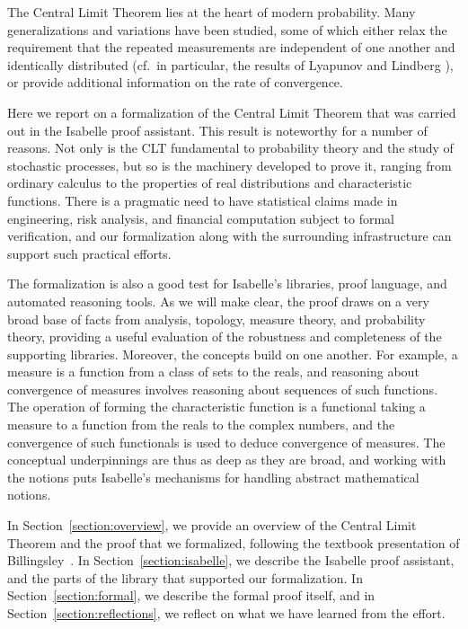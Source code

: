 \documentclass{svjour3}
\begin{document}
The Central Limit Theorem lies at the heart of modern probability. Many generalizations and variations have been studied, some of which either relax the requirement that the repeated measurements are independent of one another and identically distributed (cf.~in particular, the results of Lyapunov and Lindberg \cite{billingsley:95}), or provide additional information on the rate of convergence.

Here we report on a formalization of the Central Limit Theorem that was carried out in the Isabelle proof assistant. This result is noteworthy for a number of reasons. Not only is the CLT fundamental to probability theory and the study of stochastic processes, but so is the machinery developed to prove it, ranging from ordinary calculus to the properties of real distributions and characteristic functions. There is a pragmatic need to have statistical claims made in engineering, risk analysis, and financial computation subject to formal verification, and our formalization along with the surrounding infrastructure can support such practical efforts.

The formalization is also a good test for Isabelle's libraries, proof language, and automated reasoning tools. As we will make clear, the proof draws on a very broad base of facts from analysis, topology, measure theory, and probability theory, providing a useful evaluation of the robustness and completeness of the supporting libraries. Moreover, the concepts build on one another. For example, a measure is a function from a class of sets to the reals, and reasoning about convergence of measures involves reasoning about sequences of such functions. The operation of forming the characteristic function is a functional taking a measure to a function from the reals to the complex numbers, and the convergence of such functionals is used to deduce convergence of measures. The conceptual underpinnings are thus as deep as they are broad, and working with the notions puts Isabelle's mechanisms for handling abstract mathematical notions.

In Section~\ref{section:overview}, we provide an overview of the Central Limit Theorem and the proof that we formalized, following the textbook presentation of Billingsley~\cite{billingsley:95}. In Section~\ref{section:isabelle}, we describe the Isabelle proof assistant, and the parts of the library that supported our formalization. In Section~\ref{section:formal}, we describe the formal proof itself, and in Section~\ref{section:reflections}, we reflect on what we have learned from the effort. 
\end{document}
